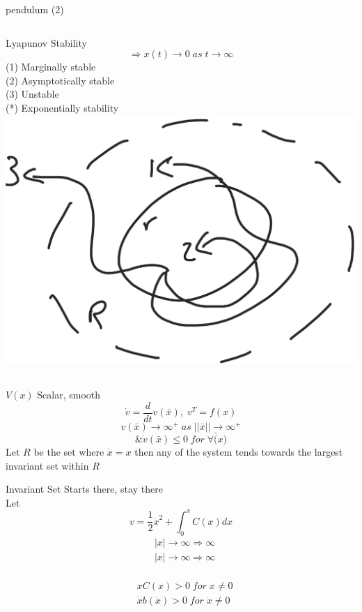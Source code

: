 \documentclass{beamer}
\begin{document}
\begin{frame}{pendulum (2)}
    \begin{columns}[T]
    Lyapunov Stability\\
    $$\Rightarrow x(t)\rightarrow 0 \; as\; t\rightarrow \infty$$
    \hspace{1cm}(1) Marginally stable\\
    \hspace{1cm}(2) Asymptotically stable\\
    \hspace{1cm}(3) Unstable\\
    \hspace{1cm}(*) Exponentially stability\\
        \includegraphics[width=\textwidth]{fig/lyapunovStability.png}   
    \end{columns}
\end{frame}

\begin{frame}{$V(x)$ Scalar, smooth}
$$\dot{v} = \frac{d}{dt}v(\bar{x}),\; v^T = f(x)$$
$$v(\bar{x})\rightarrow {\infty}^+ \; as\; ||\bar{x}|| \rightarrow {\infty}^+$$
$$\& \dot{v}(\bar{x}) \leq 0 \; for \; \forall \bar(x)$$
Let $R$ be the set where $\dot{x}=x$ then any of the system tends towards the largest invariant set within $R$ 
\end{frame}

\begin{frame}{Invariant Set}
Starts there, stay there\\
Let
$$v=\frac{1}{2}\dot{x}^2+\int_0^x C(x)dx$$
\vspace{-1cm}
\begin{align*}
    &|x| \rightarrow \infty \Rightarrow \infty\\
    &|x| \rightarrow \infty \Rightarrow \infty\\
\end{align*}

\begin{align*}
    &xC(x)>0\; for\; x \neq 0\\
    &\dot{x}b(\dot{x}) > 0\; for\; \dot{x} \neq 0
\end{align*}
\end{frame}
\end{document}
